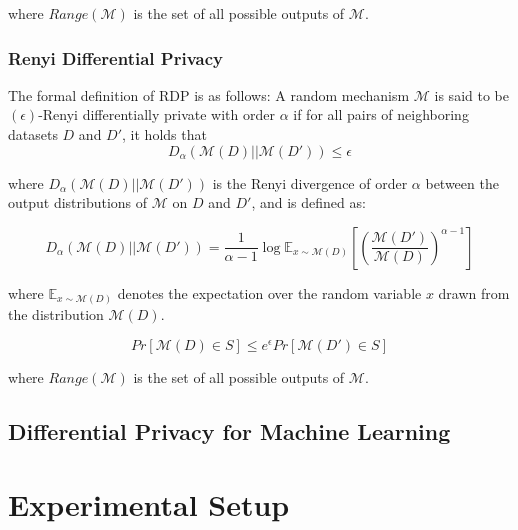     where $Range(\mathcal{M})$ is the set of all possible outputs of $\mathcal{M}$.


\subsubsection{Renyi Differential Privacy}
\label{sec:rdp}

The formal definition of RDP is as follows:
A random mechanism $\mathcal{M}$ is said to be $(\epsilon)$-Renyi differentially private with order $\alpha$ if for all pairs of neighboring datasets $D$ and $D'$, it holds that
\begin{equation}
    D_{\alpha}(\mathcal{M}(D) || \mathcal{M}(D')) \leq \epsilon
\end{equation}
    
    where $D_{\alpha}(\mathcal{M}(D) || \mathcal{M}(D'))$ is the Renyi divergence of order $\alpha$ between the output distributions of $\mathcal{M}$ on $D$ and $D'$, and is defined as:
    
    \begin{equation}
        D_{\alpha}(\mathcal{M}(D) || \mathcal{M}(D')) = \frac{1}{\alpha - 1} \log \mathbb{E}_{x \sim \mathcal{M}(D)} \left[ \left( \frac{\mathcal{M}(D')}{\mathcal{M}(D)} \right)^{\alpha - 1} \right]
    \end{equation}
        
        where $\mathbb{E}_{x \sim \mathcal{M}(D)}$ denotes the expectation over the random variable $x$ drawn from the distribution $\mathcal{M}(D)$.

        

    
\begin{equation}
    Pr[\mathcal{M}(D) \in S] \leq e^{\epsilon} Pr[\mathcal{M}(D') \in S]
\end{equation}
    
    where $Range(\mathcal{M})$ is the set of all possible outputs of $\mathcal{M}$.





\subsection{Differential Privacy for Machine Learning}
\label{sec:dpml}


\section{Experimental Setup}
\label{sec:exp}


